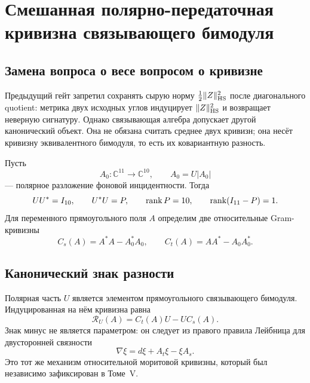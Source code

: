 \chapter{Смешанная полярно-передаточная кривизна связывающего бимодуля}
\label{ch:v7-polar-transfer-cross-curvature-origin-gate}

\section{Замена вопроса о весе вопросом о кривизне}

Предыдущий гейт запретил сохранять сырую норму
$\frac12\|Z\|_{\rm HS}^2$ после диагонального quotient: метрика двух
исходных углов индуцирует $\|Z\|_{\rm HS}^2$ и возвращает неверную
сигнатуру. Однако связывающая алгебра допускает другой канонический объект.
Она не обязана считать среднее двух кривизн; она несёт кривизну
эквивалентного бимодуля, то есть их ковариантную разность.

Пусть
\begin{equation}
 A_0:\mathbb C^{11}\longrightarrow\mathbb C^{10},
 \qquad A_0=U|A_0|
 \label{eq:v7-polar-linking-reference}
\end{equation}
--- полярное разложение фоновой инцидентности. Тогда
\begin{equation}
 UU^*=I_{10},\qquad U^*U=P,\qquad \operatorname{rank} P=10,
 \qquad \operatorname{rank}(I_{11}-P)=1.
 \label{eq:v7-polar-linking-support}
\end{equation}
Для переменного прямоугольного поля $A$ определим две относительные
Gram-кривизны
\begin{equation}
 C_s(A)=A^*A-A_0^*A_0,
 \qquad
 C_t(A)=AA^*-A_0A_0^*.
 \label{eq:v7-polar-linking-end-curvatures}
\end{equation}

\section{Канонический знак разности}

Полярная часть $U$ является элементом прямоугольного связывающего
бимодуля. Индуцированная на нём кривизна равна
\begin{equation}
 \mathcal R_U(A)=C_t(A)U-UC_s(A).
 \label{eq:v7-polar-linking-relative-curvature}
\end{equation}
Знак минус не является параметром: он следует из правого правила Лейбница
для двусторонней связности
\begin{equation}
 \nabla\xi=d\xi+A_t\xi-\xi A_s.
 \label{eq:v7-polar-linking-bimodule-connection}
\end{equation}
Это тот же механизм относительной моритовой кривизны, который был независимо
зафиксирован в Томе~V.

